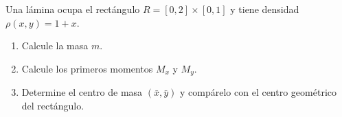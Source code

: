 Una lámina ocupa el rectángulo $R=[0,2]\times[0,1]$ y tiene densidad $\rho(x,y)=1+x$.
\begin{enumerate}
    \item Calcule la masa $m$.
    \item Calcule los primeros momentos $M_x$ y $M_y$.
    \item Determine el centro de masa $(\bar x,\bar y)$ y compárelo con el centro geométrico del rectángulo.
\end{enumerate}
